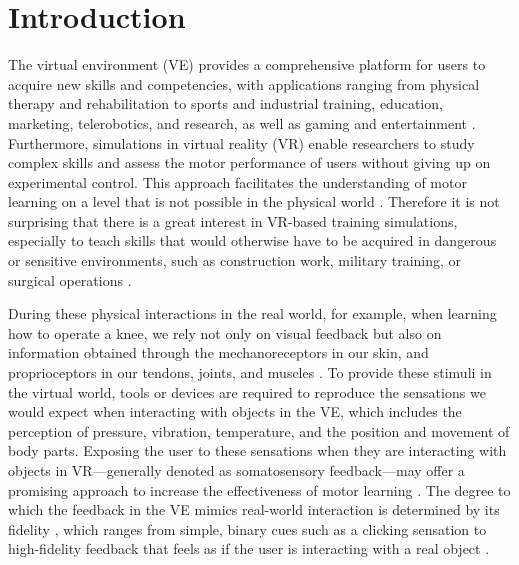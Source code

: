 
\section{Introduction}
The virtual environment (VE) provides a comprehensive platform for users to acquire new skills and competencies, with applications ranging from physical therapy and rehabilitation to sports and industrial training, education, marketing, telerobotics, and research, as well as gaming and entertainment \cite{Wu2023TrainingReality, Oagaz2022PerformanceReality}. 
Furthermore, simulations in virtual reality (VR) enable researchers to study complex skills and assess the motor performance of users without giving up on experimental control. This approach facilitates the understanding of motor learning on a level that is not possible in the physical world \cite{Harris2021ExploringSimulator, Levac2019LearningReview}. 
Therefore it is not surprising that there is a great interest in VR-based training simulations, especially to teach skills that would otherwise have to be acquired in dangerous or sensitive environments, such as construction work, military training, or surgical operations \cite{Adami2021EffectivenessTeleoperation, Lele2013VirtualUtility, Qi2021VirtualScenario}.

During these physical interactions in the real world, for example, when learning how to operate a knee, we rely not only on visual feedback but also on information obtained through the mechanoreceptors in our skin, and proprioceptors in our tendons, joints, and muscles \cite{Gonzalez-Grandon2021ProprioceptionInteraction}. To provide these stimuli in the virtual world, tools or devices are required to reproduce the sensations we would expect when interacting with objects in the VE, which includes the perception of pressure, vibration, temperature, and the position and movement of body parts. Exposing the user to these sensations when they are interacting with objects in VR---generally denoted as somatosensory feedback---may offer a promising approach to increase the effectiveness of motor learning \cite{Sainburg2022MovementNeurorehabilitation, Sigrist2013AugmentedReview}. 
The degree to which the feedback in the VE mimics real-world interaction is determined by its fidelity \cite{Caird1996PersistentTraining}, which ranges from simple, binary cues such as a clicking sensation to high-fidelity feedback that feels as if the user is interacting with a real object \cite{Yang2023}.

